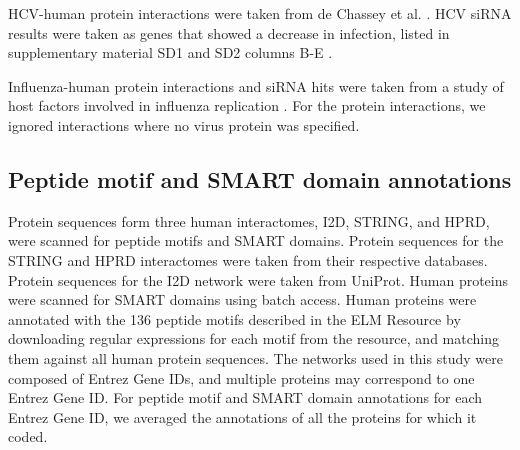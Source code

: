     HCV-human protein interactions were taken from de Chassey et
    al. \cite{dechassey08}. HCV siRNA results were taken as genes that
    showed a decrease in infection, listed in supplementary material
    SD1 and SD2 columns B-E \cite{Li09}.

    Influenza-human protein interactions and siRNA hits were taken
    from a study of host factors involved in influenza replication
    \cite{konig2009human}. For the protein interactions, we ignored
    interactions where no virus protein was specified.

   \subsection{Peptide motif and SMART domain annotations}
    Protein sequences form three human interactomes, I2D, STRING, and
    HPRD, were scanned for peptide motifs and SMART domains. Protein
    sequences for the STRING and HPRD interactomes were taken from
    their respective databases. Protein sequences for the I2D network
    were taken from UniProt. Human proteins were scanned for SMART
    domains using batch access. Human proteins were annotated with the
    136 peptide motifs described in the ELM Resource by downloading
    regular expressions for each motif from the resource, and matching
    them against all human protein sequences. The networks used in
    this study were composed of Entrez Gene IDs, and multiple proteins
    may correspond to one Entrez Gene ID. For peptide motif and SMART
    domain annotations for each Entrez Gene ID, we averaged the
    annotations of all the proteins for which it coded.


